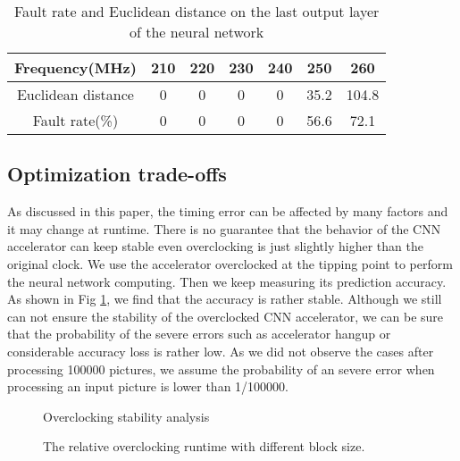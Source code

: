 \begin{table}
        \centering
        \vspace{-0.3em}
        \caption{Fault rate and Euclidean distance on the last output layer of the neural network}
        \label{tab:fr_ed}
        \vspace{-0.3em}
        \begin{tabular}{c|cccccc}
                \toprule
                Frequency(MHz) & 210 & 220 & 230 & 240 & 250 & 260 \\
                \midrule
                Euclidean distance & 0 & 0 & 0 & 0 & 35.2 & 104.8 \\
		\midrule
                Fault rate(\%) & 0 & 0 & 0 & 0 & 56.6 & 72.1 \\
                \bottomrule
        \end{tabular}
        \vspace{-1em}
\end{table}

\subsection{Optimization trade-offs}
As discussed in this paper, the timing error can be affected by many factors and it may change 
at runtime. There is no guarantee that the behavior of the CNN accelerator can keep stable even 
overclocking is just slightly higher than the original clock. We use the accelerator overclocked at the 
tipping point to perform the neural network computing. Then we keep measuring its 
prediction accuracy. As shown in Fig \ref{fig:stability}, we find that the accuracy is rather stable.
Although we still can not ensure the stability of the overclocked CNN accelerator, we can 
be sure that the probability of the severe errors such as accelerator hangup or considerable 
accuracy loss is rather low. As we did not observe the cases after processing 100000 pictures, 
we assume the probability of an severe error when processing an input picture is lower than 1/100000.

\begin{figure}
    \caption{Overclocking stability analysis}
\label{fig:stability}
\vspace{-1em}
\end{figure}

\begin{figure}
    \caption{The relative overclocking runtime with different block size.}
\label{fig:cost_block}
\vspace{-1em}
\end{figure}

